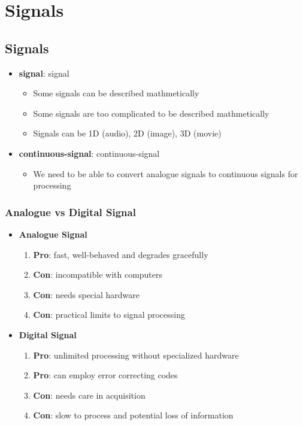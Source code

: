 \chapter{Signals}

\section{Signals}

  \begin{itemize}
    \item \textbf{\Gls{signal}}: \glsdesc{signal}
    \begin{itemize}
      \item Some signals can be described mathmetically
      \item Some signals are too complicated to be described mathmetically
      \item Signals can be 1D (audio), 2D (image), 3D (movie)
    \end{itemize}

    \item \textbf{\Gls{continuous-signal}}: \glsdesc{continuous-signal}
    \begin{itemize}
      \item We need to be able to convert analogue signals to continuous signals
      for processing
    \end{itemize}
  \end{itemize}

  \subsection{Analogue vs Digital Signal}

    \begin{itemize}
      \item \textbf{Analogue Signal}
      \begin{enumerate}
        \item \textbf{Pro}: fast, well-behaved and degrades gracefully
        \item \textbf{Con}: incompatible with computers
        \item \textbf{Con}: needs special hardware
        \item \textbf{Con}: practical limits to signal processing
      \end{enumerate}

      \item \textbf{Digital Signal}
      \begin{enumerate}
        \item \textbf{Pro}: unlimited processing without specialized hardware
        \item \textbf{Pro}: can employ error correcting codes
        \item \textbf{Con}: needs care in acquisition
        \item \textbf{Con}: slow to process and potential loss of information
      \end{enumerate}
    \end{itemize}

